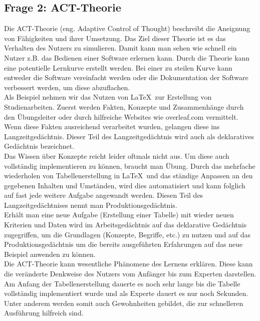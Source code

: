 \documentclass{TUBAFarbeiten}
\begin{document}
\subsection{Frage 2: ACT-Theorie}
Die ACT-Theorie (eng. Adaptive Control of Thought) beschreibt die Aneignung von Fähigkeiten und ihrer Umsetzung. Das Ziel dieser Theorie ist es das Verhalten des Nutzers zu simulieren. Damit kann man sehen wie schnell ein Nutzer z.B. das Bedienen einer Software erlernen kann. 
Durch die Theorie kann eine potentielle Lernkurve erstellt werden. Bei einer zu steilen Kurve kann entweder die Software vereinfacht werden oder die Dokumentation der Software verbessert werden, um diese abzuflachen.\\

Als Beispiel nehmen wir das Nutzen von \LaTeX\ zur Erstellung von Studienarbeiten. Zuerst werden Fakten, Konzepte und Zusammenhänge durch den Übungsleiter oder durch hilfreiche Websites wie overleaf.com vermittelt. Wenn diese Fakten ausreichend verarbeitet wurden, gelangen diese ins Langzeitgedächtnis. Dieser Teil des Langzeitgedächtnis wird auch als deklaratives Gedächtnis bezeichnet.\\
Das Wissen über Konzepte reicht leider oftmals nicht aus. Um diese auch vollständig implementieren zu können, braucht man Übung. Durch das mehrfache wiederholen von Tabellenerstellung in \LaTeX\ und das ständige Anpassen an den gegebenen Inhalten und Umständen, wird dies automatisiert und kann folglich auf fast jede weitere Aufgabe angewandt werden.
Diesen Teil des Langzeitgedächtnises nennt man Produktionsgedächtnis.\\

Erhält man eine neue Aufgabe (Erstellung einer Tabelle) mit wieder neuen Kriterien und Daten wird im Arbeitsgedächtnis auf das deklarative Gedächtnis zugegriffen, um die Grundlagen (Konzepte, Begriffe, etc.) zu nutzen und auf das Produktionsgedächtnis um die bereits ausgeführten Erfahrungen auf das neue Beispiel anwenden zu können. \\

Die ACT-Theorie kann wesentliche Phänomene des
Lernens erklären. Diese kann die veränderte Denkweise des Nutzers vom Anfänger bis zum Experten darstellen. Am Anfang der Tabellenerstellung dauerte es noch sehr lange bis die Tabelle vollständig implementiert wurde und als Experte dauert es nur noch Sekunden. Unter anderem werden somit auch Gewohnheiten gebildet, die zur schnelleren Ausführung hilfreich sind.  
\end{document}
